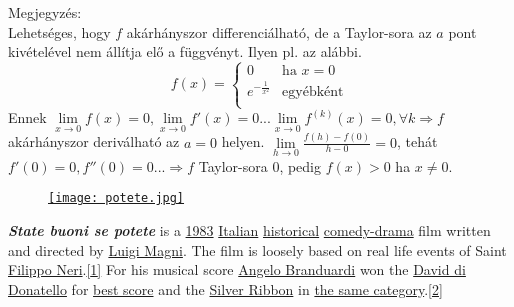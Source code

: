 \documentclass[12pt,a4paper]{scrartcl}
\newenvironment{megjegyzes}{}{}
\newenvironment{ajanlofig}{\begin{figure}\begin{center}}{
\end{center}\end{figure}}
\begin{document}
\begin{megjegyzes}

Megjegyzés:\\
Lehetséges, hogy \(f\) akárhányszor differenciálható, de a Taylor-sora
az \(a\) pont kivételével nem állítja elő a függvényt. Ilyen pl. az
alábbi. \[f\left( x \right) = \begin{cases}
0 & {\text{ha~}x = 0} \\
e^{- \frac{1}{x^{2}}} & \text{egyébként} \\
\end{cases}\] Ennek
\(\left. \underset{x\rightarrow 0}{\lim}f\left( x \right) = 0,\underset{x\rightarrow 0}{\lim}f'\left( x \right) = 0...\underset{x\rightarrow 0}{\lim}f^{(k)}\left( x \right) = 0,\forall k\Rightarrow f \right.\)
akárhányszor deriválható az \(a = 0\) helyen.
\(\underset{h\rightarrow 0}{\lim}\frac{f\left( h \right) - f\left( 0 \right)}{h - 0} = 0\),
tehát
\(\left. f'\left( 0 \right) = 0,f''\left( 0 \right) = 0...\Rightarrow f \right.\)
Taylor-sora 0, pedig \(f\left( x \right) > 0\) ha \(x \neq 0\).

\end{megjegyzes}

\begin{ajanlo}

\begin{ajanlofig}

\href{https://www.youtube.com/watch?v=o1Hbjq73-ME}{\texttt{[image: potete.jpg]}}

\end{ajanlofig}

\textbf{\emph{State buoni se potete}} is a
\href{https://en.wikipedia.org/wiki/List_of_Italian_films_of_1983}{1983}
\href{https://en.wikipedia.org/wiki/Cinema_of_Italy}{Italian}
\href{https://en.wikipedia.org/wiki/Historical_film}{historical}
\href{https://en.wikipedia.org/wiki/Comedy-drama}{comedy-drama} film
written and directed by
\href{https://en.wikipedia.org/wiki/Luigi_Magni}{Luigi Magni}. The film
is loosely based on real life events of Saint
\href{https://en.wikipedia.org/wiki/Philip_Neri}{Filippo
Neri}.\href{https://en.wikipedia.org/wiki/State_buoni_se_potete\#cite_note-80-89_m-z-1}{{[}1{]}}
For his musical score
\href{https://en.wikipedia.org/wiki/Angelo_Branduardi}{Angelo
Branduardi} won the
\href{https://en.wikipedia.org/wiki/David_di_Donatello}{David di
Donatello} for
\href{https://en.wikipedia.org/wiki/David_di_Donatello_for_Best_Score}{best
score} and the \href{https://en.wikipedia.org/wiki/Silver_Ribbon}{Silver
Ribbon} in
\href{https://en.wikipedia.org/wiki/Nastro_d\%27Argento_for_Best_Score}{the
same
category}.\href{https://en.wikipedia.org/wiki/State_buoni_se_potete\#cite_note-premi-2}{{[}2{]}}

\end{ajanlo}
\end{document}
